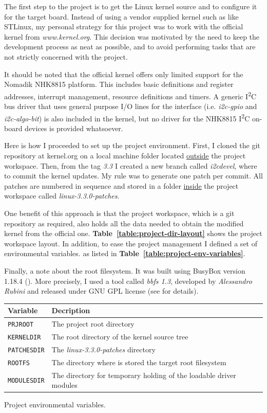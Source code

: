 \documentclass[a4paper,10pt]{article}
\makeatletter
\newenvironment{tablehere}{\def\@captype{table}}{}
\newcommand{\iic}{I\textsuperscript{2}C }
\newcommand{\reft}[1]{\textbf{Table~\ref{#1}}}
\makeatother
\begin{document}
\begin{multicols}{2}
The first step to the project is to get the Linux kernel source and to configure
it for the target board. Instead of  using a vendor supplied kernel such as like
STLinux, my personal strategy for this project was to work with the official
kernel from \emph{www.kernel.org}.
This decision was motivated by the need to keep the development process as neat
as possible, and to avoid performing tasks that are not strictly concerned with
the project.

It should be noted that the official kernel offers only limited support for the
Nomadik  NHK8815 platform.
This includes basic definitions and register addresses, interrupt management,
resource definitions and timers.
A generic \iic bus driver that uses general purpose I/O lines for the interface 
(i.e. \emph{i2c-gpio} and \emph{i2c-algo-bit}) is also included in the kernel,
but no driver for the NHK8815 \iic on-board devices is provided whatsoever.

Here is how I proceeded to set up the project environment.
First, I cloned the git repository at kernel.org on a local machine folder
located \underline{outside} the project workspace. Then, from the tag \emph{3.3}
I created a new branch called \emph{i2cdevel}, where to commit the kernel updates.
My rule was to generate one patch per commit. All patches are numbered in
sequence and stored in a folder \underline{inside} the project workspace called
\emph{linux-3.3.0-patches}.

One benefit of this approach is that the project workspace, which is a git
repository as required, also holds all the data needed to obtain the modified
kernel from the official one.
\reft{table:project-dir-layout} shows the project workspace layout.
In addition, to ease the project management I defined a set of environmental
variables. as listed in \reft{table:project-env-variables}.

Finally, a note about the root filesystem. It was built using BusyBox
version 1.18.4 (\cite{busybox}). More precisely, I used a tool called
\emph{bbfs 1.3}, developed by \emph{Alessandro Rubini} and released under
GNU GPL license (see \cite{bbfs1.3} for details).\\

\begin{tablehere}
	\centering
	\renewcommand{\arraystretch}{1.2}	
	\begin{tabular}{l p{5.5cm}}
		\hline
		Variable & Decription \\
		\hline
		\texttt{PRJROOT} & The project root directory\\
		\texttt{KERNELDIR} & The root directory of the kernel source tree \\
		\texttt{PATCHESDIR} & The \emph{linux-3.3.0-patches} directory \\
		\texttt{ROOTFS} & The directory where is stored the target root
			filesystem \\
		\texttt{MODULESDIR} & The directory for temporary holding of the
			loadable driver modules \\
		\hline
	\end{tabular}
	\caption{Project environmental variables.}
	\label{table:project-env-variables}
\end{tablehere}


\end{multicols}
\end{document}

